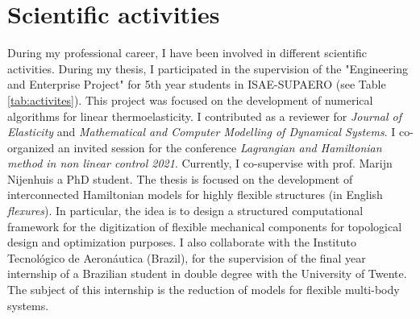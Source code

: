 \documentclass[12pt]{article}
\begin{document}
	
	
	
	\section{Scientific activities}
	
	During my professional career, I have been involved in different scientific activities. During my thesis, I participated in the supervision of the "Engineering and Enterprise Project" for 5th year students in ISAE-SUPAERO (see Table \ref{tab:activites}). This project was focused on the development of numerical algorithms for linear thermoelasticity. I contributed as a reviewer for \textit{Journal of Elasticity} and \textit{Mathematical and Computer Modelling of Dynamical Systems}. I co-organized an invited session for the conference \textit{Lagrangian and Hamiltonian method in non linear control 2021}. Currently, I co-supervise with prof. Marijn Nijenhuis a PhD student. The thesis is focused on the development of interconnected Hamiltonian models for highly flexible structures (in English \textit{flexures}). In particular, the idea is to design a structured computational framework for the digitization of flexible mechanical components for topological design and optimization purposes. I also collaborate with the Instituto Tecnológico de Aeronáutica (Brazil), for the supervision of the final year internship of a Brazilian student in double degree with the University of Twente. The subject of this internship is the reduction of models for flexible multi-body systems.
	
\end{document}
